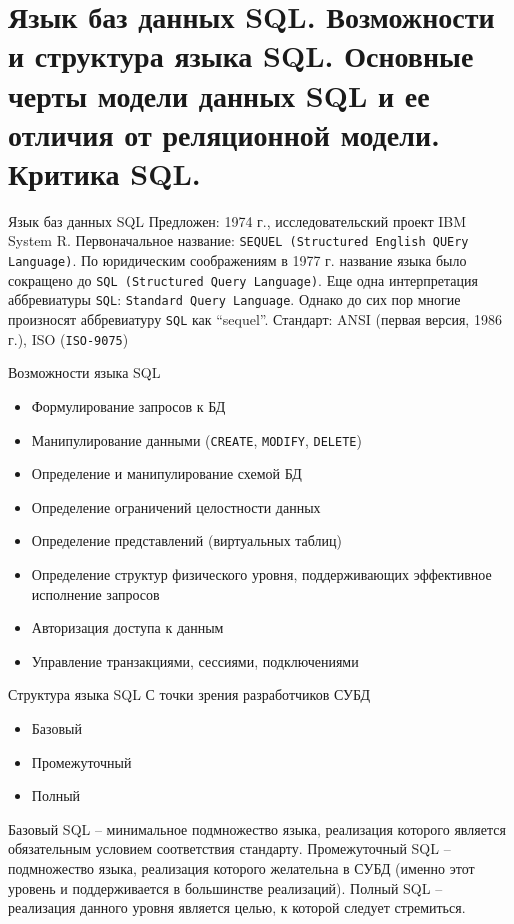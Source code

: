 \documentclass[a4paper,12pt]{article}
\begin{document}
\section{Язык баз данных SQL. Возможности и структура языка SQL. Основные черты модели данных SQL и ее отличия от реляционной модели. Критика SQL.}

Язык баз данных SQL  
Предложен: 1974 г., исследовательский проект IBM System R.  
Первоначальное название: \texttt{SEQUEL (Structured English QUEry Language)}.  
По юридическим соображениям в 1977 г. название языка было сокращено до \texttt{SQL (Structured Query Language)}.  
Еще одна интерпретация аббревиатуры \texttt{SQL}: \texttt{Standard Query Language}.  
Однако до сих пор многие произносят аббревиатуру \texttt{SQL} как “sequel”.  
Стандарт: ANSI (первая версия, 1986 г.), ISO (\texttt{ISO-9075})

Возможности языка SQL  
\begin{itemize}
\item Формулирование запросов к БД
\item Манипулирование данными (\texttt{CREATE}, \texttt{MODIFY}, \texttt{DELETE})
\item Определение и манипулирование схемой БД
\item Определение ограничений целостности данных
\item Определение представлений (виртуальных таблиц)
\item Определение структур физического уровня, поддерживающих эффективное исполнение запросов
\item Авторизация доступа к данным
\item Управление транзакциями, сессиями, подключениями
\end{itemize}

Структура языка SQL  
С точки зрения разработчиков СУБД  
\begin{itemize}
\item Базовый
\item Промежуточный
\item Полный
\end{itemize}

Базовый SQL – минимальное подмножество языка, реализация которого является обязательным условием соответствия стандарту.  
Промежуточный SQL – подмножество языка, реализация которого желательна в СУБД (именно этот уровень и поддерживается в большинстве реализаций).  
Полный SQL – реализация данного уровня является целью, к которой следует стремиться.
\end{document}
